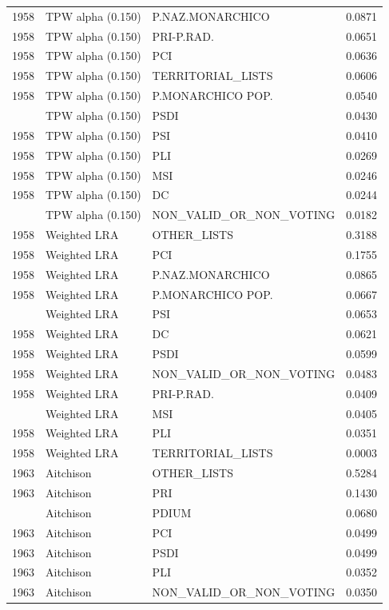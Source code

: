\begin{longtable}[t]{rllr}
1958 & TPW alpha (0.150) & P.NAZ.MONARCHICO & 0.0871\\
1958 & TPW alpha (0.150) & PRI-P.RAD. & 0.0651\\
1958 & TPW alpha (0.150) & PCI & 0.0636\\
1958 & TPW alpha (0.150) & TERRITORIAL\_LISTS & 0.0606\\
1958 & TPW alpha (0.150) & P.MONARCHICO POP. & 0.0540\\
\addlinespace
1958 & TPW alpha (0.150) & PSDI & 0.0430\\
1958 & TPW alpha (0.150) & PSI & 0.0410\\
1958 & TPW alpha (0.150) & PLI & 0.0269\\
1958 & TPW alpha (0.150) & MSI & 0.0246\\
1958 & TPW alpha (0.150) & DC & 0.0244\\
\addlinespace
1958 & TPW alpha (0.150) & NON\_VALID\_OR\_NON\_VOTING & 0.0182\\
1958 & Weighted LRA & OTHER\_LISTS & 0.3188\\
1958 & Weighted LRA & PCI & 0.1755\\
1958 & Weighted LRA & P.NAZ.MONARCHICO & 0.0865\\
1958 & Weighted LRA & P.MONARCHICO POP. & 0.0667\\
\addlinespace
1958 & Weighted LRA & PSI & 0.0653\\
1958 & Weighted LRA & DC & 0.0621\\
1958 & Weighted LRA & PSDI & 0.0599\\
1958 & Weighted LRA & NON\_VALID\_OR\_NON\_VOTING & 0.0483\\
1958 & Weighted LRA & PRI-P.RAD. & 0.0409\\
\addlinespace
1958 & Weighted LRA & MSI & 0.0405\\
1958 & Weighted LRA & PLI & 0.0351\\
1958 & Weighted LRA & TERRITORIAL\_LISTS & 0.0003\\
1963 & Aitchison & OTHER\_LISTS & 0.5284\\
1963 & Aitchison & PRI & 0.1430\\
\addlinespace
1963 & Aitchison & PDIUM & 0.0680\\
1963 & Aitchison & PCI & 0.0499\\
1963 & Aitchison & PSDI & 0.0499\\
1963 & Aitchison & PLI & 0.0352\\
1963 & Aitchison & NON\_VALID\_OR\_NON\_VOTING & 0.0350\\

\end{longtable}
